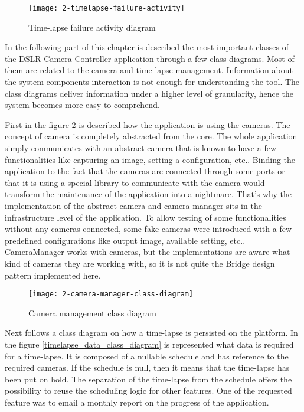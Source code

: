 \begin{figure}[!ht]
\centering
\texttt{[image: 2-timelapse-failure-activity]}
\caption{Time-lapse failure activity diagram}\label{timelapse_failure_activity}
\end{figure}

In the following part of this chapter is described the most important classes of the DSLR Camera Controller application through a few class diagrams. Most of them are related to the camera and time-lapse management. Information about the system components interaction is not enough for understanding the tool. The class diagrams deliver information under a higher level of granularity, hence the system becomes more easy to comprehend.

First in the figure \mbox{\ref{camera_manager_class_diagram}} is described how the application is using the cameras. The concept of camera is completely abstracted from the core. The whole application simply communicates with an abstract camera that is known to have a few functionalities like capturing an image, setting a configuration, etc.. Binding the application to the fact that the cameras are connected through some ports or that it is using a special library to communicate with the camera would transform the maintenance of the application into a nightmare. That's why the implementation of the abstract camera and camera manager sits in the infrastructure level of the application. To allow testing of some functionalities without any cameras connected, some fake cameras were introduced with a few predefined configurations like output image, available setting, etc.. CameraManager works with cameras, but the implementations are aware what kind of cameras they are working with, so it is not quite the Bridge design pattern implemented here.

\begin{figure}[!ht]
\centering
\texttt{[image: 2-camera-manager-class-diagram]}
\caption{Camera management class diagram}\label{camera_manager_class_diagram}
\end{figure}

Next follows a class diagram on how a time-lapse is persisted on the platform. In the figure \mbox{\ref{timelapse_data_class_diagram}} is represented what data is required for a time-lapse. It is composed of a nullable schedule and has reference to the required cameras. If the schedule is null, then it means that the time-lapse has been put on hold. The separation of the time-lapse from the schedule offers the possibility to reuse the scheduling logic for other features. One of the requested feature was to email a monthly report on the progress of the application.

